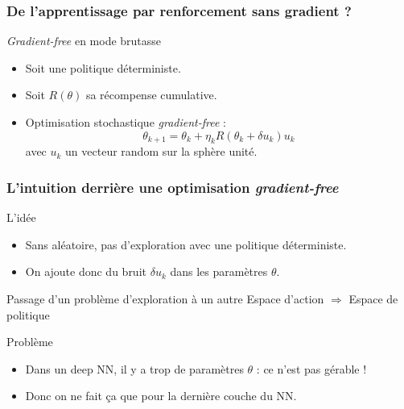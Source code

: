 \documentclass[smaller]{beamer}
\begin{document}

\begin{frame}
  \frametitle{De l'apprentissage par renforcement sans gradient ?}

  \begin{block}{{\it Gradient-free} en mode brutasse}
    \begin{itemize}
    \item Soit une politique déterministe.
    \item Soit $R(\theta)$ sa récompense cumulative.
    \item Optimisation stochastique {\it gradient-free} :
      \begin{displaymath}
        \theta_{k+1} = \theta_k + \eta_k R(\theta_k + \delta u_k) u_k
      \end{displaymath}
      avec $u_k$ un vecteur random sur la sphère unité.
    \end{itemize}
  \end{block}

\end{frame}


\begin{frame}
  \frametitle{L'intuition derrière une optimisation {\it gradient-free}}

  \begin{exampleblock}{L'idée}
    \begin{itemize}
    \item  Sans  aléatoire,  pas   d'exploration  avec  une  politique
      déterministe.
    \item On  ajoute donc  du bruit $\delta  u_k$ dans  les paramètres
      $\theta$.
    \end{itemize}    
  \end{exampleblock}

  {
    \begin{block}{Passage d'un problème d'exploration à un autre}
      Espace d'action $\Rightarrow$ Espace de politique
    \end{block}
  }
  
  {
    \begin{alertblock}{Problème}
      \begin{itemize}
      \item Dans  un deep NN,  il y a trop  de paramètres $\theta$  : ce
        n'est pas gérable !
      \item Donc on ne fait ça que pour la dernière couche du NN.
      \end{itemize}    
    \end{alertblock}
  }

\end{frame}
\end{document}
